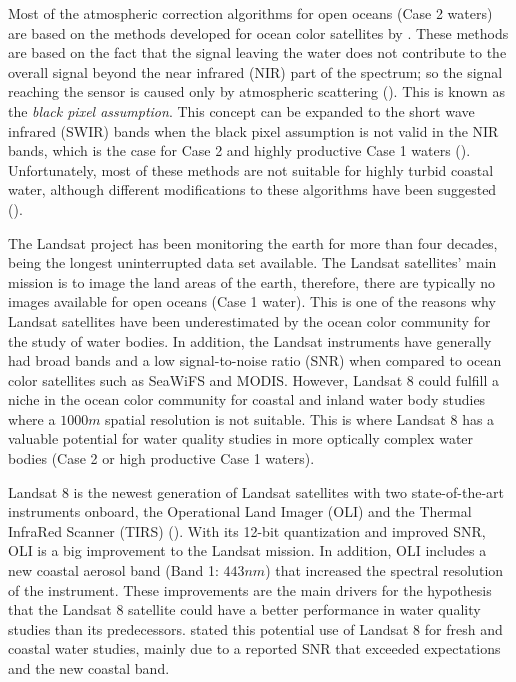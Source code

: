 \documentclass[onecolumn,3p,letterpaper]{elsarticle}
\begin{document}
Most of the atmospheric correction algorithms for open oceans (Case 2 waters) are based on the methods developed for ocean color satellites by \cite{Gordon:1997}. These methods are based on the fact that the signal leaving the water does not contribute to the overall signal beyond the near infrared (NIR) part of the spectrum; so the signal reaching the sensor is caused only by atmospheric scattering (\cite{Gordon:1994}). This is known as the {\it black pixel assumption}. This concept can be expanded to the short wave infrared (SWIR) bands when the black pixel assumption is not valid in the NIR bands, which is the case for Case 2 and highly productive Case 1 waters (\cite{Wang:2007}). Unfortunately, most of these methods are not suitable for highly turbid coastal water, although different modifications to these algorithms have been suggested (\cite{Patt2003}).

The Landsat project has been monitoring the earth for more than four decades, being the longest uninterrupted data set available. The Landsat satellites' main mission is to image the land areas of the earth, therefore, there are typically no images available for open oceans (Case 1 water). This is one of the reasons why Landsat satellites have been underestimated by the ocean color community for the study of water bodies. In addition, the Landsat instruments have generally had broad bands and a low signal-to-noise ratio (SNR) when compared to ocean color satellites such as SeaWiFS and MODIS. However, Landsat 8 could fulfill a niche in the ocean color community for coastal and inland water body studies where a $1000m$ spatial resolution is not suitable. This is where Landsat 8 has a valuable potential for water quality studies in more optically complex water bodies (Case 2 or high productive Case 1 waters). 

Landsat 8 is the newest generation of Landsat satellites with two state-of-the-art instruments onboard, the Operational Land Imager (OLI) and the Thermal InfraRed Scanner (TIRS) (\cite{Irons:2012}). With its 12-bit quantization and improved SNR, OLI is a big improvement to the Landsat mission. In addition, OLI includes a new coastal aerosol band (Band 1: $443nm$) that increased the spectral resolution of the instrument. These improvements are the main drivers for the hypothesis that the Landsat 8 satellite could have a better performance in water quality studies than its predecessors. \cite{Roy:2014} stated this potential use of Landsat 8 for fresh and coastal water studies, mainly due to a reported SNR that exceeded expectations and the new coastal band. 
\end{document}
